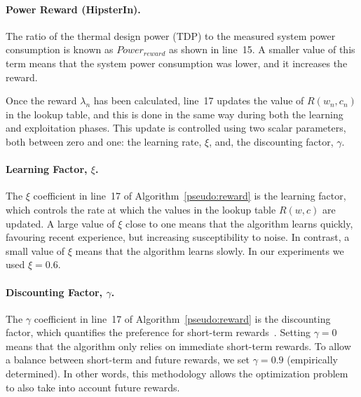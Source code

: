 \paragraph*{Power Reward (HipsterIn).} The ratio of the thermal design power (TDP) to the
measured system power consumption is known as $Power_{\mathit{reward}}$ as shown in
line~15. A smaller value of this term means that the system power consumption was lower,
and it increases the reward. 

\vspace{1.5mm}

Once the reward $\lambda_n$ has been calculated, line~17 updates the value of $R(w_n,
c_n)$ in the lookup table, and this is done in the same way during both the learning and
exploitation phases. This update is controlled using two scalar parameters, both between
zero and one: the learning rate, $\xi$, and, the discounting factor, $\gamma$.

 \paragraph*{Learning Factor, $\xi$.} The $\xi$ coefficient in line~17 of
Algorithm~\ref{pseudo:reward} is the learning factor, which controls the rate at which the
values in the lookup table $R(w,c)$ are updated. A large value of $\xi$ close to one means
that the algorithm learns quickly, favouring recent experience, but increasing
susceptibility to noise. In contrast, a small value of $\xi$ means that the algorithm
learns slowly. In our experiments we used $\xi=0.6$. 

\paragraph*{Discounting Factor, $\gamma$.} The $\gamma$ coefficient in line~17 of
Algorithm~\ref{pseudo:reward} is the discounting factor, which quantifies the preference
for short-term rewards~\citep{Suton.R.S1998ReinforcementIntroduction}. Setting $\gamma=0$
means that the algorithm only relies on immediate short-term rewards. To allow a
balance between short-term and future rewards, we set $\gamma=0.9$ (empirically
determined). In other words, this methodology allows the optimization problem to also
take into account future rewards.



